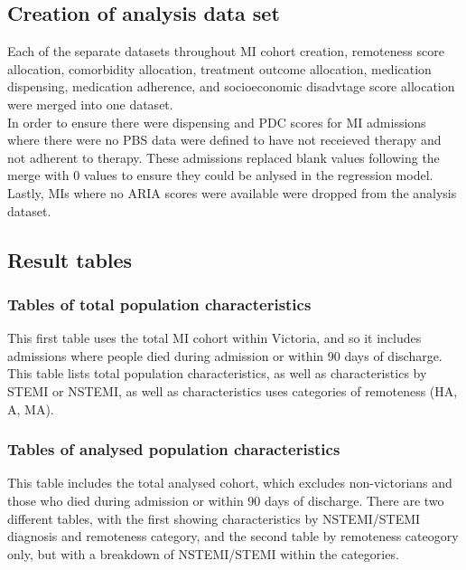 \documentclass[11pt]{article}
\begin{document}
\subsection{Creation of analysis data set}
Each of the separate datasets throughout MI cohort creation, remoteness score allocation, comorbidity allocation, treatment outcome allocation, medication dispensing, medication adherence, and socioeconomic disadvtage score allocation were merged into one dataset. \\
In order to ensure there were dispensing and PDC scores for MI admissions where there were no PBS data were defined to have not receieved therapy and not adherent to therapy. These admissions replaced blank values following the merge with 0 values to ensure they could be anlysed in the regression model. \\
Lastly, MIs where no ARIA scores were available were dropped from the analysis dataset. 
\color{violet}
\begin{stlog}\end{stlog}
\color{black}
\subsection{Result tables}
\subsubsection{Tables of total population characteristics}
This first table uses the total MI cohort within Victoria, and so it includes admissions where people died during admission or within 90 days of discharge. This table lists total population characteristics, as well as characteristics by STEMI or NSTEMI, as well as characteristics uses categories of remoteness (HA, A, MA). 
\color{violet}
\begin{stlog}\end{stlog}
\color{black}
\subsubsection{Tables of analysed population characteristics}
This table includes the total analysed cohort, which excludes non-victorians and those who died during admission or within 90 days of discharge. There are two different tables, with the first showing characteristics by NSTEMI/STEMI diagnosis and remoteness category, and the second table by remoteness cateogory only, but with a breakdown of NSTEMI/STEMI within the categories. 
\color{violet}
\begin{stlog}\end{stlog}
\color{black}
\end{document}
